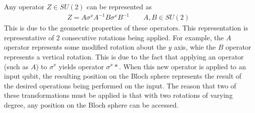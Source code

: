 \documentclass{exam} %
\theoremstyle{plain}
\theoremstyle{definition}
\theoremstyle{remark}
\numberwithin{equation}{section}  %
\begin{document}
\begin{questions}
\begin{solution}
    Any operator $Z \in SU(2)$ can be represented as
    \begin{align*}
      Z = A\sigma^xA^{-1}B\sigma^xB^{-1} \qquad A, B \in SU(2)
    \end{align*}
    This is due to the geometric properties of these operators. This representation
    is representative of 2 consecutive rotations being applied. For example,
    the $A$ operator represents some modified rotation about the $y$ axis, whie
    the $B$ operator represents a vertical rotation. This is due to the fact that
    applying an operator (such as $A$) to $\sigma^x$ yields operator $\sigma^x*$. When
    this new operator is applied to an input qubit, the resulting position on the Bloch
    sphere represents the result of the desired operations being performed on the input. 
    The reason that two of these transformations must be applied
    is that with two rotations of varying degree, any position on the Bloch sphere
    can be accessed.\\


\end{solution}
\end{questions}
\end{document}
